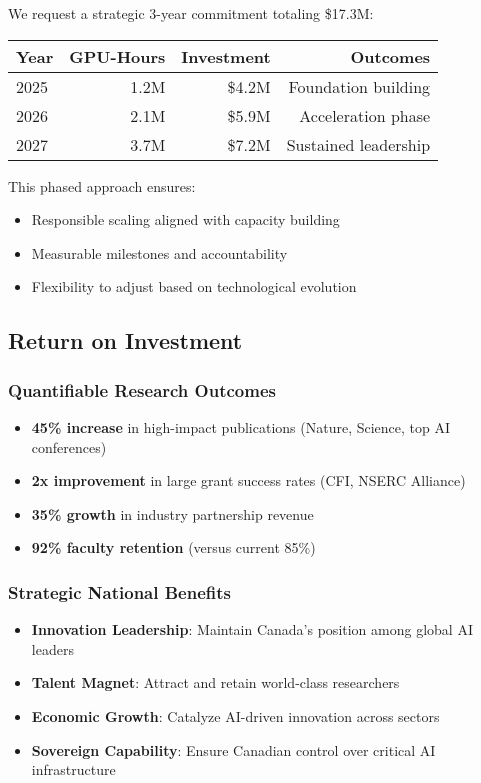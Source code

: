 We request a strategic 3-year commitment totaling \$17.3M:

\begin{table}[h]
\centering
\begin{tabular}{lrrr}
\toprule
Year & GPU-Hours & Investment & Outcomes \\
\midrule
2025 & 1.2M & \$4.2M & Foundation building \\
2026 & 2.1M & \$5.9M & Acceleration phase \\
2027 & 3.7M & \$7.2M & Sustained leadership \\
\bottomrule
\end{tabular}
\end{table}

This phased approach ensures:
\begin{itemize}
\item Responsible scaling aligned with capacity building
\item Measurable milestones and accountability
\item Flexibility to adjust based on technological evolution
\end{itemize}

\subsection{Return on Investment}

\subsubsection{Quantifiable Research Outcomes}
\begin{itemize}
\item \textbf{45\% increase} in high-impact publications (Nature, Science, top AI conferences)
\item \textbf{2x improvement} in large grant success rates (CFI, NSERC Alliance)
\item \textbf{35\% growth} in industry partnership revenue
\item \textbf{92\% faculty retention} (versus current 85\%)
\end{itemize}

\subsubsection{Strategic National Benefits}
\begin{itemize}
\item \textbf{Innovation Leadership}: Maintain Canada's position among global AI leaders
\item \textbf{Talent Magnet}: Attract and retain world-class researchers
\item \textbf{Economic Growth}: Catalyze AI-driven innovation across sectors
\item \textbf{Sovereign Capability}: Ensure Canadian control over critical AI infrastructure
\end{itemize}

